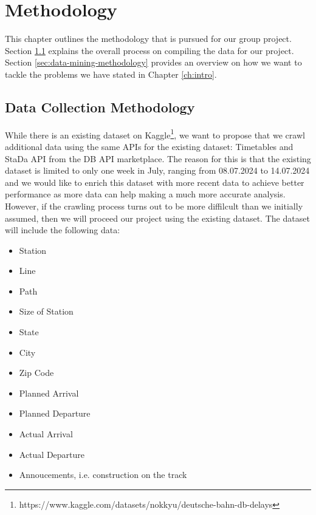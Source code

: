 \documentclass[a4paper,oneside,bibliography=totoc]{scrbook}
\begin{document}
\chapter{Methodology}
\label{ch:methodology}
This chapter outlines the methodology that is pursued for our group project. Section \ref{sec:dataset} explains the overall process on compiling the data for our project. Section \ref{sec:data-mining-methodology} provides an overview on how we want to tackle the problems we have stated in Chapter \ref{ch:intro}.

\section{Data Collection Methodology}\label{sec:dataset}
While there is an existing dataset on Kaggle\footnote{https://www.kaggle.com/datasets/nokkyu/deutsche-bahn-db-delays}, we want to propose that we crawl additional data using the same APIs for the existing dataset: Timetables and StaDa API from the DB API marketplace.
The reason for this is that the existing dataset is limited to only one week in July, ranging from 08.07.2024 to 14.07.2024 and we would like to enrich this dataset with more recent data to achieve better performance as more data can help making a much more accurate analysis.
However, if the crawling process turns out to be more diffilcult than we initially assumed, then we will proceed our project using the existing dataset.
The dataset will include the following data:
\begin{itemize}
    \item Station
    \item Line
    \item Path
    \item Size of Station
    \item State
    \item City
    \item Zip Code
    \item Planned Arrival
    \item Planned Departure
    \item Actual Arrival
    \item Actual Departure
    \item Annoucements, i.e. construction on the track
\end{itemize}
\end{document}
